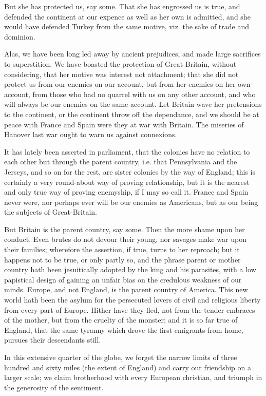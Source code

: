 \documentclass[12pt,oneside]{memoir}
\begin{document}
But she has protected us, say some. That she has engrossed us is
true, and defended the continent at our expence as well as her own
is admitted, and she would have defended Turkey from the same motive,
viz. the sake of trade and dominion.

Alas, we have been long led away by ancient prejudices, and made
large sacrifices to superstition. We have boasted the protection of
Great-Britain, without considering, that her motive was interest not
attachment; that she did not protect us from our enemies on our
account, but from her enemies on her own account, from those who had
no quarrel with us on any other account, and who will always be our
enemies on the same account. Let Britain wave her pretensions to the
continent, or the continent throw off the dependance, and we should
be at peace with France and Spain were they at war with Britain. The
miseries of Hanover last war ought to warn us against connexions.

It has lately been asserted in parliament, that the colonies have no
relation to each other but through the parent country, i.e. that
Pennsylvania and the Jerseys, and so on for the rest, are sister
colonies by the way of England; this is certainly a very round-about
way of proving relationship, but it is the nearest and only true way
of proving enemyship, if I may so call it. France and Spain never
were, nor perhaps ever will be our enemies as Americans, but as our
being the subjects of Great-Britain.

But Britain is the parent country, say some. Then the more shame
upon her conduct. Even brutes do not devour their young, nor savages
make war upon their families; wherefore the assertion, if true,
turns to her reproach; but it happens not to be true, or only partly
so, and the phrase parent or mother country hath been jesuitically
adopted by the king and his parasites, with a low papistical design
of gaining an unfair bias on the credulous weakness of our minds.
Europe, and not England, is the parent country of America. This new
world hath been the asylum for the persecuted lovers of civil and
religious liberty from every part of Europe. Hither have they fled,
not from the tender embraces of the mother, but from the cruelty of
the monster; and it is so far true of England, that the same tyranny
which drove the first emigrants from home, pursues their descendants
still.

In this extensive quarter of the globe, we forget the narrow limits
of three hundred and sixty miles (the extent of England) and carry
our friendship on a larger scale; we claim brotherhood with every
European christian, and triumph in the generosity of the sentiment.
\end{document}
